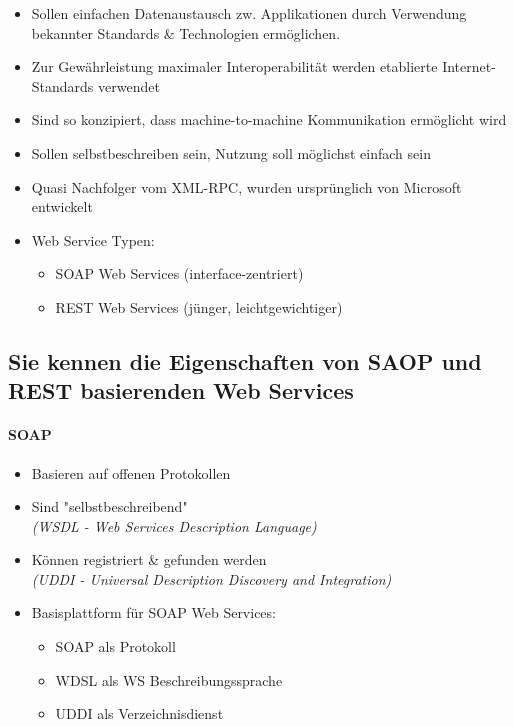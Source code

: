 \documentclass[a4paper]{article}
\begin{document}
			\begin{itemize}
				\item Sollen einfachen Datenaustausch zw. Applikationen durch Verwendung bekannter Standards \& Technologien ermöglichen.
				\item Zur Gewährleistung maximaler Interoperabilität werden etablierte Internet-Standards verwendet
				\item Sind so konzipiert, dass machine-to-machine Kommunikation ermöglicht wird
				\item Sollen selbstbeschreiben sein, Nutzung soll möglichst einfach sein
				\item Quasi Nachfolger vom XML-RPC, wurden ursprünglich von Microsoft entwickelt
				\item Web Service Typen:
					\begin{itemize}
						\item SOAP Web Services (interface-zentriert)
						\item REST Web Services (jünger, leichtgewichtiger)
					\end{itemize}
			\end{itemize}
		
		\subsection{Sie kennen die Eigenschaften von SAOP und REST basierenden Web Services}
		
				\paragraph{SOAP}
				
					\begin{itemize}
						\item Basieren auf offenen Protokollen
						\item Sind "selbstbeschreibend" \\
							\textit{(WSDL - Web Services Description Language)}
						\item Können registriert \& gefunden werden \\
							\textit{(UDDI - Universal Description Discovery and Integration)}
						\item Basisplattform für SOAP Web Services:
							\begin{itemize}
								\item SOAP als Protokoll
								\item WDSL als WS Beschreibungssprache
								\item UDDI als Verzeichnisdienst
							\end{itemize}
					\end{itemize}
				
\end{document}
